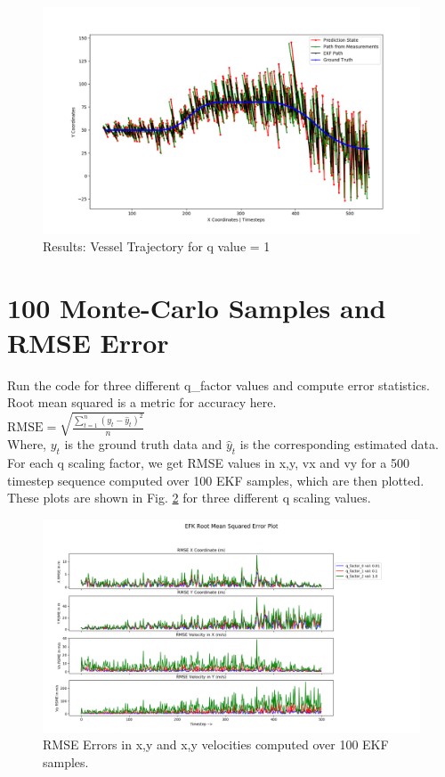 \documentclass[12pt]{article}
\begin{document}
\begin{figure}[]
\centering
\includegraphics[width=\textwidth]{../results/path_q1.png}
\caption{Results: Vessel Trajectory for q value = 1}
\label{fig:EKF_3}
\end{figure}
  
  
  

\section{100 Monte-Carlo Samples and RMSE Error}
Run the code for three different q\_factor values and compute error statistics. Root mean squared is a metric for accuracy here. \\

$\mathrm{RMSE} = \sqrt{\frac{\sum_{t=1}^{n}{(y_t - \hat{y}_t)^2}}{n}}$\\

Where, $y_{t}$ is the ground truth data and $\hat{y}_{t}$ is the corresponding estimated data.\\

For each q scaling factor, we get RMSE values in x,y, vx and vy  for a 500 timestep sequence computed over 100 EKF samples, which are  then plotted. These plots are shown in  Fig. \ref{fig:EKF_results} for three different q scaling values. 

\begin{figure}[!th]
\centering
\includegraphics[width=\textwidth]{../results/EKF_results_main.png}
\caption{RMSE Errors in x,y and x,y velocities computed over 100 EKF samples.}
\label{fig:EKF_results}
\end{figure}
\end{document}
